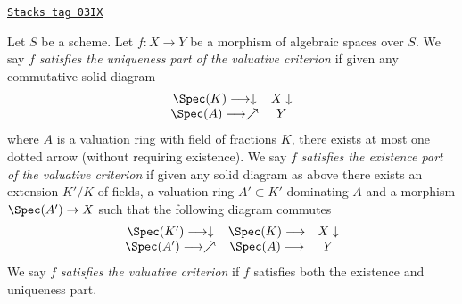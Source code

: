 \begin{definition}
\label{spaces-morphisms-definition-valuative-criterion}
\href{https://stacks.math.columbia.edu/tag/03IX}{\texttt{Stacks tag 03IX}}

Let $S$ be a scheme.
Let $f : X \to Y$ be a morphism of algebraic spaces over $S$.
We say $f$ {\it satisfies the uniqueness part of the valuative criterion}
if given any commutative solid diagram
$$
\begin{array}{cc}\Spec(K) \longrightarrow\downarrow & X \downarrow \\ \Spec(A) \longrightarrow\nearrow & Y\end{array}
$$
where $A$ is a valuation ring with field of fractions $K$, there exists
at most one dotted arrow (without requiring existence).
We say $f$ {\it satisfies the existence part of the valuative criterion}
if given any solid diagram as above there exists an extension
$K'/K$ of fields, a valuation ring $A' \subset K'$ dominating
$A$ and a morphism $\Spec(A') \to X$ such that the following
diagram commutes
$$
\begin{array}{ccc}\Spec(K') \longrightarrow\downarrow & \Spec(K) \longrightarrow & X \downarrow \\ \Spec(A') \longrightarrow\nearrow & \Spec(A) \longrightarrow & Y\end{array}
$$
We say $f$ {\it satisfies the valuative criterion}
if $f$ satisfies both the existence and uniqueness part.
\end{definition}

